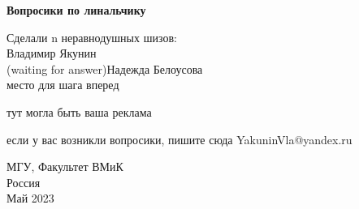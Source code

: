 \begin{titlepage}
    \begin{center}
  
       \vspace*{1cm}
        \huge
       \textbf{Вопросики по линальчику}
        \normalsize

  
            
       \vspace{1.5cm}

       \begin{flushright}
       Сделали n неравнодушных шизов:\\
       Владимир Якунин \\
       (waiting for answer)Надежда Белоусова\\
       место для шага вперед
       \end{flushright}

       \vfill
            тут могла быть ваша реклама
       \vfill
     
        если у вас возникли вопросики, пишите сюда YakuninVla@yandex.ru
        
       МГУ, Факультет ВМиК\\
       Россия\\
       Май 2023
    \end{center}
\end{titlepage}